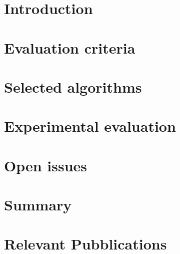 
\section{Introduction}
\label{Introduction}

%
%

%

\section{Evaluation criteria}
\label{criteria}




\section{Selected algorithms}
\label{algorithms}


\section{Experimental evaluation}
\label{experimental}


\section{Open issues}
\label{openissues}


\section{Summary}
\label{conclusion}


\section{Relevant Pubblications}

